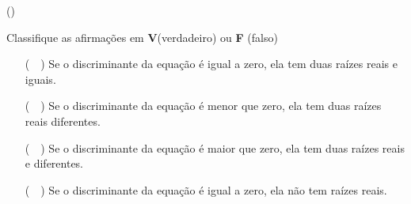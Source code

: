 \begin{question}[type=exam] () %

Classifique as afirmações em \textbf{V}(verdadeiro) ou \textbf{F} (falso)

\begin{itemize}
    \item [(~~)] Se o discriminante da equação é igual a zero, ela tem duas raízes reais e iguais.
    \item [(~~)] Se o discriminante da equação é menor que zero, ela tem duas raízes reais diferentes.
    \item [(~~)] Se o discriminante da equação é maior que zero, ela tem duas raízes reais e diferentes.
    \item [(~~)] Se o discriminante da equação é igual a zero, ela não tem raízes reais.
\end{itemize}
\end{question}
